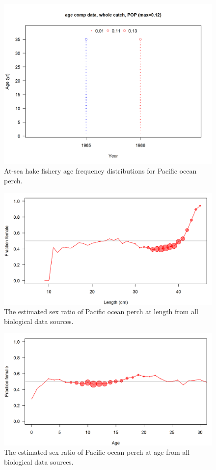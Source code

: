 \documentclass[12pt,]{article}
\begin{document}
\begin{figure}
\centering
\includegraphics{r4ss/plots_mod1/comp_agedat_bubflt2mkt0.png}
\caption{At-sea hake fishery age frequency distributions for Pacific
ocean perch. \label{fig:ASHOP_Age}}
\end{figure}

\FloatBarrier

\begin{figure}
\centering
\includegraphics{Figures/allSexRatios.png}
\caption{The estimated sex ratio of Pacific ocean perch at length from
all biological data sources. \label{fig:sexratio}}
\end{figure}

\begin{figure}
\centering
\includegraphics{Figures/allSexRatiosAge.png}
\caption{The estimated sex ratio of Pacific ocean perch at age from all
biological data sources. \label{fig:sexratio_Age}}
\end{figure}
\end{document}
